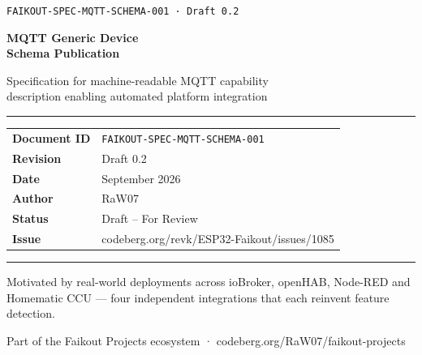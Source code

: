 \documentclass[11pt,a4paper]{article}
\begin{document}
\begin{titlepage}
  \pagecolor{primary}
  \color{white}
  \vspace*{30mm}

  {\fontsize{11}{13}\selectfont\color{accent!70}\texttt{FAIKOUT-SPEC-MQTT-SCHEMA-001 · Draft 0.2}}

  \vspace{8mm}
  {\fontsize{28}{34}\selectfont\bfseries MQTT Generic Device\\[4pt]Schema Publication}

  \vspace{6mm}
  {\fontsize{16}{20}\selectfont\color{white!80}Specification for machine-readable MQTT capability\\description enabling automated platform integration}

  \vspace{16mm}
  \color{accent!50}\rule{\textwidth}{0.5pt}
  \vspace{6mm}

  \begin{tabular}{@{}ll}
    \textbf{Document ID} & \texttt{FAIKOUT-SPEC-MQTT-SCHEMA-001} \\[4pt]
    \textbf{Revision}    & Draft 0.2 \\[4pt]
    \textbf{Date}        & September 2026 \\[4pt]
    \textbf{Author}      & RaW07 \\[4pt]
    \textbf{Status}      & Draft – For Review \\[4pt]
    \textbf{Issue}       & codeberg.org/revk/ESP32-Faikout/issues/1085 \\
  \end{tabular}

  \vspace{16mm}
  \color{accent!50}\rule{\textwidth}{0.5pt}
  \vspace{6mm}

  {\small\color{white!60}
  Motivated by real-world deployments across ioBroker, openHAB, Node-RED and\\
  Homematic CCU — four independent integrations that each reinvent feature detection.}

  \vfill
  {\small\color{white!40}Part of the Faikout Projects ecosystem · codeberg.org/RaW07/faikout-projects}
\end{titlepage}
\pagecolor{white}
\color{black}

\setcounter{page}{1}
\tableofcontents
\newpage
\end{document}
